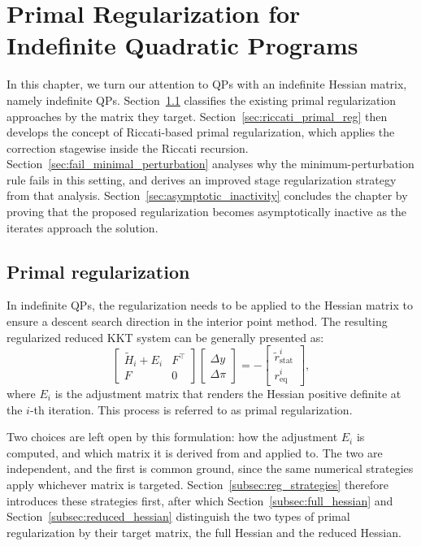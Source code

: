 \documentclass[class=scrbook, crop=false]{standalone}
\begin{document}
\chapter{Primal Regularization for Indefinite Quadratic Programs}
\label{Chapter::Primal_Regularization}
In this chapter, we turn our attention to QPs with an indefinite Hessian matrix, namely indefinite QPs.
Section~\ref{sec:hessian_reg} classifies the existing primal regularization approaches by the matrix they target.
Section~\ref{sec:riccati_primal_reg} then develops the concept of Riccati-based primal regularization,
which applies the correction stagewise inside the Riccati recursion.
Section~\ref{sec:fail_minimal_perturbation} analyses why the minimum-perturbation rule fails in this setting,
and derives an improved stage regularization strategy from that analysis.
Section~\ref{sec:asymptotic_inactivity} concludes the chapter by proving that the proposed regularization
becomes asymptotically inactive as the iterates approach the solution.

\section{Primal regularization}
\label{sec:hessian_reg}
In indefinite QPs, the regularization needs to be applied to the Hessian matrix to ensure a descent search direction in the interior point method.
The resulting regularized reduced KKT system can be generally presented as:
\begin{equation}
    \begin{bmatrix}
     \tilde{H}_i + E_i & F^\top \\
    F & 0
    \end{bmatrix}
    \begin{bmatrix}
    \Delta y \\
    \Delta \pi
    \end{bmatrix} = -
    \begin{bmatrix}
    \tilde{r}_{\mathrm{stat}}^i \\
    r_{\mathrm{eq}}^i
    \end{bmatrix},
\end{equation}
where $E_i$ is the adjustment matrix that renders the Hessian positive definite at the $i$-th iteration.
This process is referred to as primal regularization.

Two choices are left open by this formulation: 
how the adjustment $E_i$ is computed, and which matrix it is derived from and applied to.
The two are independent, and the first is common ground,
since the same numerical strategies apply whichever matrix is targeted.
Section~\ref{subsec:reg_strategies} therefore introduces these strategies first,
after which Section~\ref{subsec:full_hessian} and Section~\ref{subsec:reduced_hessian}
distinguish the two types of primal regularization by their target matrix,
the full Hessian and the reduced Hessian.
\end{document}

